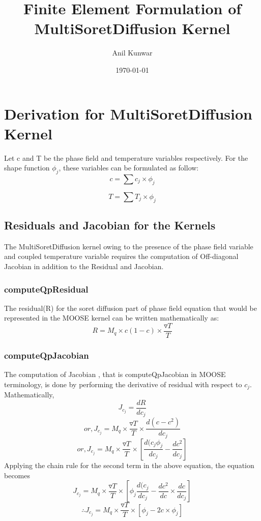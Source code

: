 \documentclass[12pt,a4paper]{article}
\title {\bf  Finite Element Formulation of MultiSoretDiffusion Kernel}
\author{Anil Kunwar}
\affil{School of Materials Science and Engineering ,Dalian University of Technology , 116024,Dalian, China}
\date{\today}
\begin{document}
 \maketitle
\section{Derivation for MultiSoretDiffusion Kernel}
 Let c and T be the phase field and temperature variables respectively. For the shape function $ \phi_j$, these variables can be formulated as follow:
 \begin{equation}
 c = \sum c_j \times \phi_j
 \end{equation}
 
 \begin{equation}
 T = \sum T_j \times \phi_j
 \end{equation}
 \subsection{Residuals and Jacobian for the Kernels}
 The MultiSoretDiffusion kernel owing to the presence of the phase field variable and coupled temperature variable requires the computation of Off-diagonal Jacobian in addition to the Residual and Jacobian.
 \subsubsection{computeQpResidual}
 The residual(R) for the soret diffusion part of phase field equation that would be represented in the MOOSE kernel can be written mathematically as:
 \begin{equation}
 R = M_q \times c (1-c) \times \frac{\triangledown T}{T}
 \end{equation}
 \subsubsection{computeQpJacobian}
  The computation of Jacobian , that is computeQpJacobian in MOOSE terminology, is done by performing the derivative of residual with respect to $c_j$. Mathematically,
  \begin{equation}
  J_{c_j} = \frac{dR}{dc_j}
  \end{equation}
  \begin{displaymath}
      or, J_{c_j} = M_q \times \frac{\triangledown T}{T} \times \frac{d(c-c^2)}{dc_j} 
 \end{displaymath}
 \begin{displaymath}
 or, J_{c_j} = M_q \times \frac{\triangledown T}{T} \times [\frac{d(c_j \phi_j}{dc_j} - \frac{dc^2}{dc_j}]
  \end{displaymath} 
  Applying the chain rule for the second term in the above equation, the equation becomes
  \begin{displaymath}
    J_{c_j} = M_q \times \frac{\triangledown T}{T} \times [\phi_j \frac{d(c_j }{dc_j} - \frac{dc^2}{dc} \times \frac{dc}{dc_j}]
\end{displaymath}  
\begin{equation}
\therefore J_{c_j} = M_q \times \frac{\triangledown T}{T} \times [\phi_j  - 2c \times \phi_j] 
\end{equation} 
\end{document}

